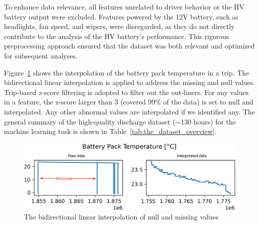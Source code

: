 To enhance data relevance, all features unrelated to driver behavior or the \gls{HV} battery output were excluded. 
Features powered by the 12V battery, such as headlights, fan speed, and wipers, were disregarded, as they do not directly contribute to the analysis of the HV battery's performance. 
This rigorous preprocessing approach ensured that the dataset was both relevant and optimized for subsequent analyses.
    
Figure~\ref{fig:intepo} shows the interpolation of the battery pack temperature in a trip. 
The bidirectional linear interpolation is applied to address the missing and null values. 
Trip-based z-score filtering is adopted to filter out the out-liners. 
For any values in a feature, the z-score larger than 3 (covered 99\% of the data) is set to null and interpolated. 
Any other abnormal values are interpolated if we identified any. 
The general summary of the high-quality discharge dataset ($\sim$130 hours) for the machine learning task is shown in Table~\ref{tab:the_dataset_overview}. 

\begin{figure}[ht]%
    \begin {center}
    \includegraphics[width=1\textwidth]{Chapter5/figures/interpolated_temp.png}
    \caption{The bidirectional linear interpolation of null and missing values}
    \label{fig:intepo}
    \end {center}
\end{figure}

